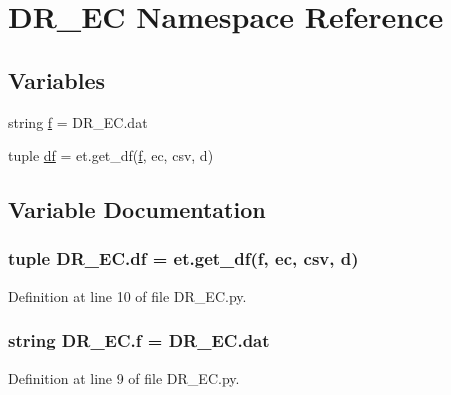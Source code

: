 \hypertarget{namespace_d_r___e_c}{}\section{D\+R\+\_\+\+E\+C Namespace Reference}
\label{namespace_d_r___e_c}
\subsection*{Variables}
\begin{DoxyCompactItemize}
\item 
string \hyperlink{namespace_d_r___e_c_a9a613c3082ebba655a69e69185821879}{f} = \textquotesingle{}D\+R\+\_\+\+E\+C.\+dat\textquotesingle{}
\item 
tuple \hyperlink{namespace_d_r___e_c_a849f81e16400fa6ef7c269c894aa32e2}{df} = et.\+get\+\_\+df(\hyperlink{namespace_d_r___e_c_a9a613c3082ebba655a69e69185821879}{f}, \textquotesingle{}ec\textquotesingle{}, \textquotesingle{}csv\textquotesingle{}, \textquotesingle{}d\textquotesingle{})
\end{DoxyCompactItemize}


\subsection{Variable Documentation}
\hypertarget{namespace_d_r___e_c_a849f81e16400fa6ef7c269c894aa32e2}{}
\subsubsection[{df}]{\setlength{\rightskip}{0pt plus 5cm}tuple D\+R\+\_\+\+E\+C.\+df = et.\+get\+\_\+df({\bf f}, \textquotesingle{}ec\textquotesingle{}, \textquotesingle{}csv\textquotesingle{}, \textquotesingle{}d\textquotesingle{})}\label{namespace_d_r___e_c_a849f81e16400fa6ef7c269c894aa32e2}


Definition at line 10 of file D\+R\+\_\+\+E\+C.\+py.

\hypertarget{namespace_d_r___e_c_a9a613c3082ebba655a69e69185821879}{}
\subsubsection[{f}]{\setlength{\rightskip}{0pt plus 5cm}string D\+R\+\_\+\+E\+C.\+f = \textquotesingle{}D\+R\+\_\+\+E\+C.\+dat\textquotesingle{}}\label{namespace_d_r___e_c_a9a613c3082ebba655a69e69185821879}


Definition at line 9 of file D\+R\+\_\+\+E\+C.\+py.

